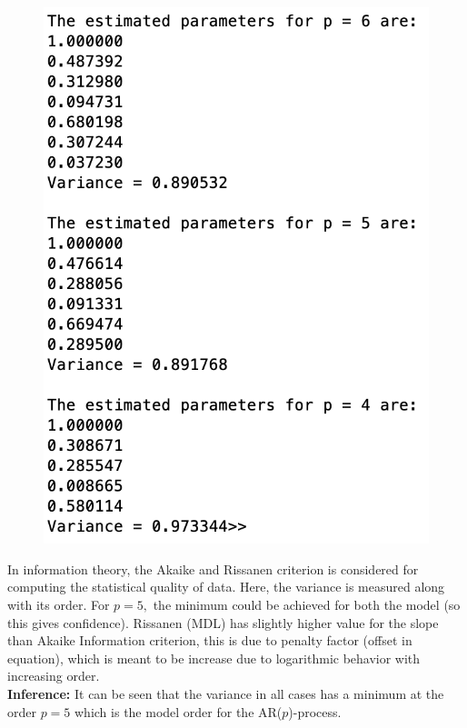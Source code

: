 \begin{figure}[H]
\centering
{\includegraphics[scale=0.55]{ass6_2.png}}
\end{figure}
\noindent In information theory, the Akaike and Rissanen criterion is considered for computing the statistical quality of data. Here, the variance is measured along with its order. For $p=5,$ the minimum could be achieved for both the model (so this gives confidence). Rissanen (MDL) has slightly higher value for the slope than Akaike Information criterion, this is due to penalty factor (offset in equation), which is meant to be increase due to logarithmic behavior with increasing order.\\

\noindent \textbf{Inference:} It can be seen that the variance in all cases has a minimum at the order $p=5$ which is the model order for the AR($p$)-process.

